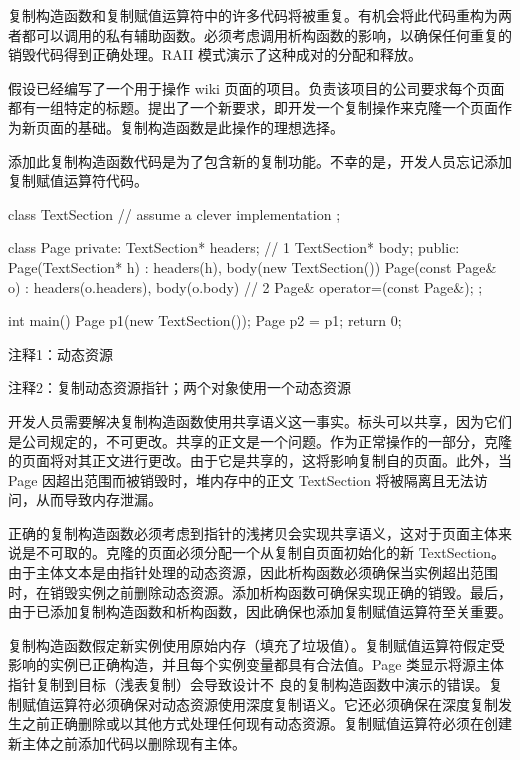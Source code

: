 复制构造函数和复制赋值运算符中的许多代码将被重复。有机会将此代码重构为两者都可以调用的私有辅助函数。必须考虑调用析构函数的影响，以确保任何重复的销毁代码得到正确处理。RAII 模式演示了这种成对的分配和释放。

假设已经编写了一个用于操作 wiki 页面的项目。负责该项目的公司要求每个页面都有一组特定的标题。提出了一个新要求，即开发一个复制操作来克隆一个页面作为新页面的基础。复制构造函数是此操作的理想选择。

添加此复制构造函数代码是为了包含新的复制功能。不幸的是，开发人员忘记添加复制赋值运算符代码。


\begin{cpp}
class TextSection {
  // assume a clever implementation
};

class Page {
private:
  TextSection* headers; // 1
  TextSection* body;
public:
  Page(TextSection* h) : headers(h), body(new TextSection()) {}
  Page(const Page& o) : headers(o.headers), body(o.body) {} // 2
  Page& operator=(const Page&);
};

int main() {
  Page p1(new TextSection());
  Page p2 = p1;
  return 0;
}
\end{cpp}

{\footnotesize
注释1：动态资源

注释2：复制动态资源指针；两个对象使用一个动态资源
}


开发人员需要解决复制构造函数使用共享语义这一事实。标头可以共享，因为它们是公司规定的，不可更改。共享的正文是一个问题。作为正常操作的一部分，克隆的页面将对其正文进行更改。由于它是共享的，这将影响复制自的页面。此外，当 Page 因超出范围而被销毁时，堆内存中的正文 TextSection 将被隔离且无法访问，从而导致内存泄漏。

正确的复制构造函数必须考虑到指针的浅拷贝会实现共享语义，这对于页面主体来说是不可取的。克隆的页面必须分配一个从复制自页面初始化的新 TextSection。由于主体文本是由指针处理的动态资源，因此析构函数必须确保当实例超出范围时，在销毁实例之前删除动态资源。添加析构函数可确保实现正确的销毁。最后，由于已添加复制构造函数和析构函数，因此确保也添加复制赋值运算符至关重要。

复制构造函数假定新实例使用原始内存（填充了垃圾值）。复制赋值运算符假定受影响的实例已正确构造，并且每个实例变量都具有合法值。Page 类显示将源主体指针复制到目标（浅表复制）会导致设计不 良的复制构造函数中演示的错误。复制赋值运算符必须确保对动态资源使用深度复制语义。它还必须确保在深度复制发生之前正确删除或以其他方式处理任何现有动态资源。复制赋值运算符必须在创建新主体之前添加代码以删除现有主体。

